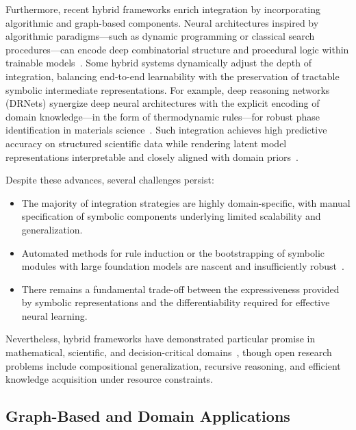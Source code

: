 Furthermore, recent hybrid frameworks enrich integration by incorporating algorithmic and graph-based components. Neural architectures inspired by algorithmic paradigms—such as dynamic programming or classical search procedures—can encode deep combinatorial structure and procedural logic within trainable models~\cite{ref5,ref56}. Some hybrid systems dynamically adjust the depth of integration, balancing end-to-end learnability with the preservation of tractable symbolic intermediate representations. For example, deep reasoning networks (DRNets) synergize deep neural architectures with the explicit encoding of domain knowledge—in the form of thermodynamic rules—for robust phase identification in materials science~\cite{ref45}. Such integration achieves high predictive accuracy on structured scientific data while rendering latent model representations interpretable and closely aligned with domain priors~\cite{ref45,ref93}.

Despite these advances, several challenges persist:
\begin{itemize}
    \item The majority of integration strategies are highly domain-specific, with manual specification of symbolic components underlying limited scalability and generalization.
    \item Automated methods for rule induction or the bootstrapping of symbolic modules with large foundation models are nascent and insufficiently robust~\cite{ref1,ref22,ref45,ref49,ref54}.
    \item There remains a fundamental trade-off between the expressiveness provided by symbolic representations and the differentiability required for effective neural learning.
\end{itemize}
Nevertheless, hybrid frameworks have demonstrated particular promise in mathematical, scientific, and decision-critical domains~\cite{ref1,ref5,ref10,ref11,ref42,ref45,ref49,ref54,ref68,ref86}, though open research problems include compositional generalization, recursive reasoning, and efficient knowledge acquisition under resource constraints.

\subsection{Graph-Based and Domain Applications}

